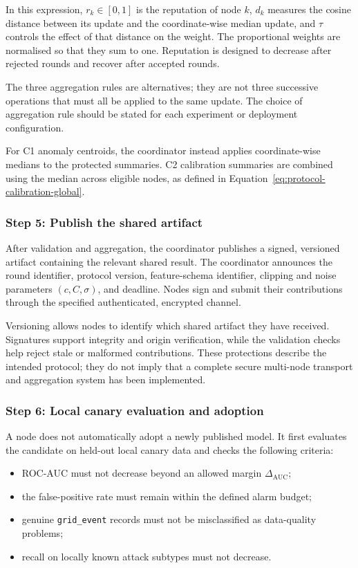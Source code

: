 \documentclass[11pt,a4paper]{article}
\newcommand{\code}[1]{\texttt{#1}}
\begin{document}
In this expression, $r_k\in[0,1]$ is the reputation of node $k$,
$d_k$ measures the cosine distance between its update and the
coordinate-wise median update, and $\tau$ controls the effect of
that distance on the weight. The proportional weights are normalised
so that they sum to one. Reputation is designed to decrease after
rejected rounds and recover after accepted rounds.

The three aggregation rules are alternatives; they are not three
successive operations that must all be applied to the same update.
The choice of aggregation rule should be stated for each experiment
or deployment configuration.

For C1 anomaly centroids, the coordinator instead applies
coordinate-wise medians to the protected summaries. C2 calibration
summaries are combined using the median across eligible nodes, as
defined in Equation~\ref{eq:protocol-calibration-global}.

\subsubsection{Step 5: Publish the shared artifact}

After validation and aggregation, the coordinator publishes a signed,
versioned artifact containing the relevant shared result. The
coordinator announces the round identifier, protocol version,
feature-schema identifier, clipping and noise parameters $(c,C,\sigma)$,
and deadline. Nodes sign and submit their contributions through the
specified authenticated, encrypted channel.

Versioning allows nodes to identify which shared artifact they have
received. Signatures support integrity and origin verification, while
the validation checks help reject stale or malformed contributions.
These protections describe the intended protocol; they do not imply
that a complete secure multi-node transport and aggregation system
has been implemented.

\subsubsection{Step 6: Local canary evaluation and adoption}

A node does not automatically adopt a newly published model. It first
evaluates the candidate on held-out local canary data and checks the
following criteria:
\begin{itemize}
    \item ROC-AUC must not decrease beyond an allowed margin
    $\Delta_{\mathrm{AUC}}$;
    \item the false-positive rate must remain within the defined alarm
    budget;
    \item genuine \code{grid\_event} records must not be misclassified
    as data-quality problems;
    \item recall on locally known attack subtypes must not decrease.
\end{itemize}
\end{document}
